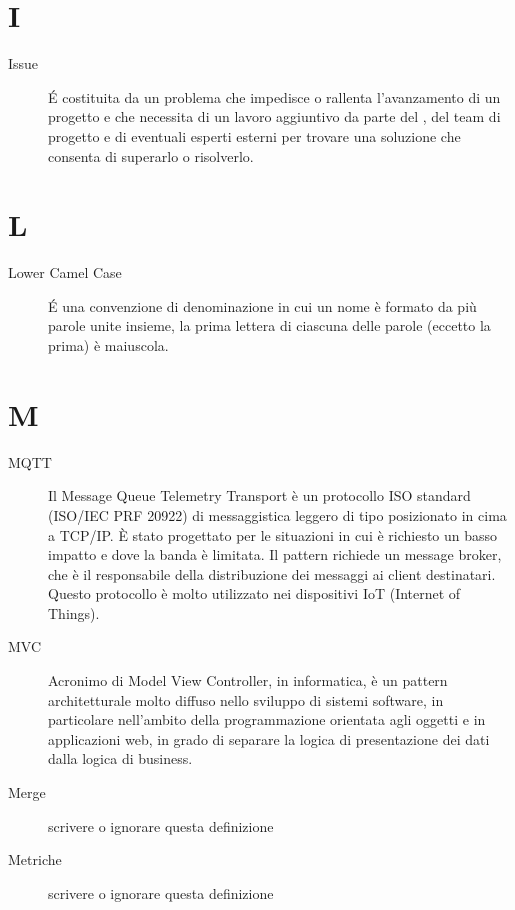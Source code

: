 \documentclass[a4paper, oneside]{article}
\begin{document}
\section{I}
\begin{description}
  \item[Issue] É costituita da un problema che impedisce o rallenta l'avanzamento di un progetto e che necessita di un lavoro aggiuntivo da parte del \RdP{}, del team di progetto e di eventuali esperti esterni per trovare una soluzione che consenta di superarlo o risolverlo.
\end{description}
\newpage
\section{L}
\begin{description}
  \item[Lower Camel Case] É una convenzione di denominazione in cui un nome è formato da più parole unite insieme, la prima lettera di ciascuna delle parole (eccetto la prima) è maiuscola.
\end{description}
\newpage
\section{M}
\begin{description}
  \item[MQTT] Il Message Queue Telemetry Transport è un protocollo ISO standard (ISO/IEC PRF 20922) di messaggistica leggero di tipo  posizionato in cima a TCP/IP. È stato progettato per le situazioni in cui è richiesto un basso impatto e dove la banda è limitata. Il pattern  richiede un message broker, che è il responsabile della distribuzione dei messaggi ai client destinatari. Questo protocollo è molto utilizzato nei dispositivi IoT (Internet of Things).
  \item[MVC] Acronimo di Model View Controller, in informatica, è un pattern architetturale molto diffuso nello sviluppo di sistemi software, in particolare nell'ambito della programmazione orientata agli oggetti e in applicazioni web, in grado di separare la logica di presentazione dei dati dalla logica di business.
  \item[Merge] {scrivere o ignorare questa definizione}
  \item[Metriche] {scrivere o ignorare questa definizione}
\end{description}
\newpage
\end{document}
